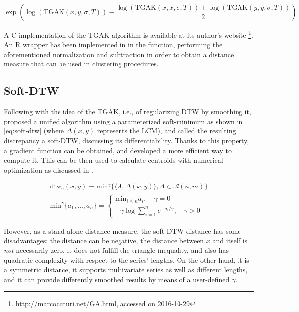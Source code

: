 \begin{equation}
\label{eq:tgak-norm}
\exp \left( \log\left( \text{TGAK}(x,y,\sigma,T) \right) - \frac{\log\left( \text{TGAK}(x,x,\sigma,T) \right) + \log\left( \text{TGAK}(y,y,\sigma,T) \right)}{2} \right)
\end{equation}

A C implementation of the TGAK algorithm is available at its author's website%
\footnote{\url{http://marcocuturi.net/GA.html}, accessed on 2016-10-29}.
An R wrapper has been implemented in \dtwclust{} in the  function,
performing the aforementioned normalization and subtraction in order to obtain a distance measure that can be used in clustering procedures.

\subsection{Soft-DTW}
\label{sec:sdtw}

Following with the idea of the TGAK,
i.e., of regularizing DTW by smoothing it,
\citet{cuturi2017} proposed a unified algorithm using a parameterized soft-minimum as shown in \cref{eq:soft-dtw}
(where $\Delta(x,y)$ represents the LCM),
and called the resulting discrepancy a soft-DTW,
discussing its differentiability.
Thanks to this property,
a gradient function can be obtained,
and \citet{cuturi2017} developed a more efficient way to compute it.
This can be then used to calculate centroids with numerical optimization as discussed in .

\begin{subequations}
\label{eq:soft-dtw}
\begin{gather}
\text{dtw}_\gamma(x,y) = \text{min} ^ \gamma \lbrace \langle A, \Delta(x,y) \rangle, A \in \mathcal{A}(n,m) \rbrace \\
\text{min} ^ \gamma \lbrace a_1, \ldots, a_n \rbrace =
\begin{cases}
\text{min}_{i \leq n} a_i, \quad \gamma = 0 \\
-\gamma \log \sum_{i=1}^{n} e^{-a_i / \gamma}, \quad \gamma > 0
\end{cases}
\end{gather}
\end{subequations}

However, as a stand-alone distance measure,
the soft-DTW distance has some disadvantages:
the distance can be negative,
the distance between $x$ and itself is \textit{not} necessarily zero,
it does not fulfill the triangle inequality,
and also has quadratic complexity with respect to the series' lengths.
On the other hand,
it is a symmetric distance,
it supports multivariate series as well as different lengths,
and it can provide differently smoothed results by means of a user-defined $\gamma$.

